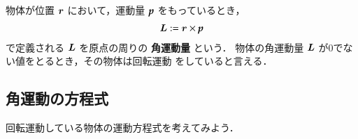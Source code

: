                 物体が位置 $\boldsymbol{r}$ において，運動量 $\textit{\textbf{p}}$ をもっているとき，
                            \begin{align}
                            \boldsymbol{L}
                            := \boldsymbol{r} \times \textit{\textbf{p}}
                            \end{align}
                で定義される $\boldsymbol{L}$ を原点の周りの \textbf{角運動量} という．
                物体の角運動量 $\boldsymbol{L}$ が0でない値をとるとき，その物体は回転運動
                をしていると言える．

        \subsection{角運動の方程式}
                回転運動している物体の運動方程式を考えてみよう．


